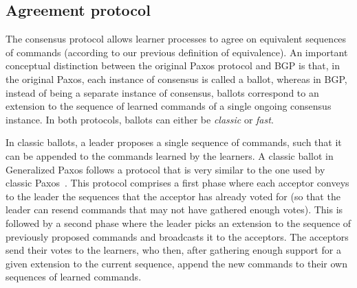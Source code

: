 \subsection{Agreement protocol} 

The consensus protocol allows learner processes to agree on equivalent sequences of commands (according to our previous definition of equivalence).
An important conceptual distinction between the original Paxos protocol and BGP is that, in the original Paxos, each instance of consensus is called a ballot, whereas in BGP, instead of being a separate instance of consensus, ballots correspond to an extension to the sequence of learned commands of a single ongoing consensus instance. In both protocols, ballots can either be \textit{classic} or \textit{fast}. \par


In classic ballots, a leader proposes a single sequence of commands, such that it can be appended to the commands learned by the learners. 
A classic ballot in Generalized Paxos follows a protocol that is very similar to the one used by classic Paxos~\cite{Lam98}. This protocol comprises a first phase where each acceptor conveys to the leader the sequences that the acceptor has already voted for (so that the leader can resend commands that may not have gathered enough votes).
This is followed by a second phase where the leader picks an extension to the sequence of previously proposed commands and broadcasts it to the acceptors. The acceptors send their votes to the learners, who then, after gathering enough support for a given extension to the current sequence, append the new commands to their own sequences of learned commands.\par

